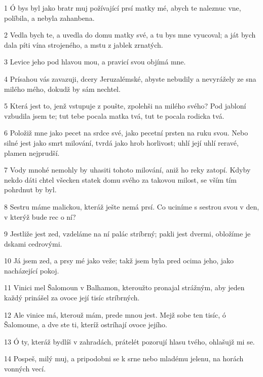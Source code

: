 \par 1 Ó bys byl jako bratr muj požívající prsí matky mé, abych te naleznuc vne, políbila, a nebyla zahanbena.
\par 2 Vedla bych te, a uvedla do domu matky své, a tu bys mne vyucoval; a ját bych dala píti vína strojeného, a mstu z jablek zrnatých.
\par 3 Levice jeho pod hlavou mou, a pravicí svou objímá mne.
\par 4 Prísahou vás zavazuji, dcery Jeruzalémské, abyste nebudily a nevyrážely ze sna milého mého, dokudž by sám nechtel.
\par 5 Která jest to, jenž vstupuje z poušte, zpolehši na milého svého? Pod jabloní vzbudila jsem te; tut tebe pocala matka tvá, tut te pocala rodicka tvá.
\par 6 Položiž mne jako pecet na srdce své, jako pecetní prsten na ruku svou. Nebo silné jest jako smrt milování, tvrdá jako hrob horlivost; uhlí její uhlí reravé, plamen nejprudší.
\par 7 Vody mnohé nemohly by uhasiti tohoto milování, aniž ho reky zatopí. Kdyby nekdo dáti chtel všecken statek domu svého za takovou milost, se vším tím pohrdnut by byl.
\par 8 Sestru máme malickou, kteráž ješte nemá prsí. Co uciníme s sestrou svou v den, v kterýž bude rec o ní?
\par 9 Jestliže jest zed, vzdeláme na ní palác stríbrný; pakli jest dvermi, obložíme je dskami cedrovými.
\par 10 Já jsem zed, a prsy mé jako veže; takž jsem byla pred ocima jeho, jako nacházející pokoj.
\par 11 Vinici mel Šalomoun v Balhamon, kteroužto pronajal strážným, aby jeden každý prinášel za ovoce její tisíc stríbrných.
\par 12 Ale vinice má, kterouž mám, prede mnou jest. Mejž sobe ten tisíc, ó Šalomoune, a dve ste ti, kteríž ostríhají ovoce jejího.
\par 13 Ó ty, kteráž bydlíš v zahradách, prátelét pozorují hlasu tvého, ohlašujž mi se.
\par 14 Pospeš, milý muj, a pripodobni se k srne nebo mladému jelenu, na horách vonných vecí.

